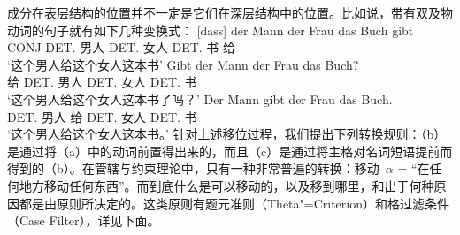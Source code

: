 成分在表层结构的位置并不一定是它们在深层结构中的位置。比如说，带有双及物动词的句子就有如下几种变换式：
\eal
\ex 
\gll {}[dass] der Mann der Frau das Buch gibt\\
	 {}\spacebr{}CONJ DET.\nom{}  男人 DET.\dat{} 女人 DET.\acc{} 书 给\\
\glt `这个男人给这个女人这本书'
\ex 
\gll Gibt der Mann der Frau das Buch?\\
	 给 DET.\nom{} 男人 DET.\dat{} 女人 DET.\acc{} 书\\
\glt `这个男人给这个女人这本书了吗？'
\ex 
\gll Der Mann gibt der Frau das Buch.\\
	 DET.\nom{} 男人 给 DET.\dat{} 女人 DET.\acc{} 书\\
\glt `这个男人给这个女人这本书。'
\zl
针对上述移位过程，我们提出下列转换规则：（b）是通过将（a）中的动词前置得出来的，而且（c）是通过将主格对名词短语提前而得到的（b）。在管辖与约束理论中，只有一种非常普遍的转换：移动~$\alpha$ = ``在任何地方移动任何东西''。而到底什么是可以移动的，以及移到哪里，和出于何种原因都是由原则所决定的。这类原则有题元准则（Theta"=Criterion）和格过滤条件（Case Filter），详见下面。

